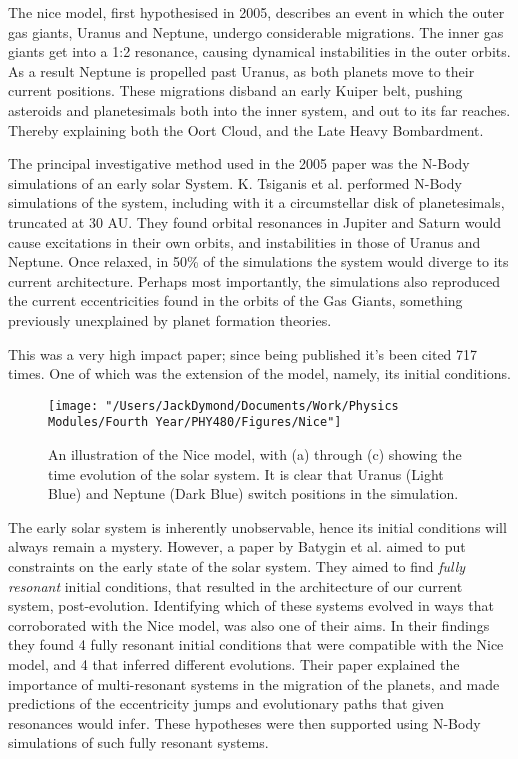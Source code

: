 \documentclass[a4paper,10pt]{article}
\begin{document}
The nice model, first hypothesised in 2005\cite{Nice}, describes an event in which the outer gas giants, Uranus and Neptune, undergo considerable migrations. The inner gas giants get into a 1:2 resonance, causing dynamical instabilities in the outer orbits. As a result Neptune is propelled past Uranus, as both planets move to their current positions. These migrations disband an early Kuiper belt, pushing asteroids and planetesimals both into the inner system, and out to its far reaches. Thereby explaining both the Oort Cloud, and the Late Heavy Bombardment. 

The principal investigative method used in the 2005 paper was the N-Body simulations of an early solar System. K. Tsiganis et al. performed N-Body simulations of the system, including with it a circumstellar disk of planetesimals, truncated at 30 AU. They found orbital resonances in Jupiter and Saturn would cause excitations in their own orbits, and instabilities in those of Uranus and Neptune. Once relaxed, in 50\% of the simulations the system would diverge to its current architecture. Perhaps most importantly, the simulations also reproduced the current eccentricities found in the orbits of the Gas Giants, something previously unexplained by planet formation theories.

This was a very high impact paper; since being published it's been cited 717 times. One of which was the extension of the model, namely, its initial conditions. 

\begin{figure}[h!]
\centering
\texttt{[image: "/Users/JackDymond/Documents/Work/Physics Modules/Fourth Year/PHY480/Figures/Nice"]}
\caption{An illustration of the Nice model, with (a) through (c) showing the time evolution of the solar system. It is clear that Uranus (Light Blue) and Neptune (Dark Blue) switch positions in the simulation.}
\label{NiceFig}
\end{figure}

The early solar system is inherently unobservable, hence its initial conditions will always remain a mystery. However, a paper by Batygin et al. aimed to put constraints on the early state of the solar system\cite{Initial}. They aimed to find \textit{fully resonant} initial conditions, that resulted in the architecture of our current system, post-evolution. Identifying which of these systems evolved in ways that corroborated with the Nice model, was also one of their aims. In their findings they found 4 fully resonant initial conditions that were compatible with the Nice model, and 4 that inferred different evolutions. Their paper explained the importance of multi-resonant systems in the migration of the planets, and made predictions of the eccentricity jumps and evolutionary paths that given resonances would infer. These hypotheses were then supported using N-Body simulations of such fully resonant systems.
\end{document}
